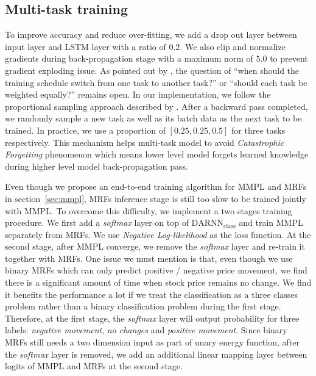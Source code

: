 \subsection{Multi-task training}
\label{sec:multi_train}

To improve accuracy and reduce over-fitting, we add a drop out
layer between input layer and LSTM layer with a ratio of $0.2$.
We also clip and normalize gradients during back-propagation
stage with a maximum norm of $5.0$ to prevent gradient exploding
issue. As pointed out by , the
question of ``when should the training schedule switch from one
task to another task?'' or ``should each task be weighted
equally?'' remains open. In our implementation, we follow the
proportional sampling approach described by
. After a backward pass completed, we
randomly sample a new task as well as its batch data as the next
task to be trained. In practice, we use a proportion of
$[0.25,0.25,0.5]$ for three tasks respectively. This mechanism
helps multi-task model to avoid \emph{Catastrophic Forgetting}
phenomenon which means lower level model forgets learned
knowledge during higher level model back-propagation pass.

Even though we propose an end-to-end training algorithm for MMPL
and MRFs in section~\ref{sec:mmpl}, MRFs inference stage is still
too slow to be trained jointly with MMPL. To overcome this
difficulty, we implement a two stages training procedure. We
first add a \emph{softmax} layer on top of
$\text{DARNN}_{\text{class}}$ and train MMPL separately from
MRFs. We use \emph{Negative Log-likelihood} as the loss function.
At the second stage, after MMPL converge, we remove the
\emph{softmax} layer and re-train it together with MRFs. One
issue we must mention is that, even though we use binary MRFs
which can only predict positive / negative price movement, we
find there is a significant amount of time when stock price
remains no change. We find it benefits the performance a lot if
we treat the classification as a three classes problem rather
than a binary classification problem during the first stage.
Therefore, at the first stage, the \emph{softmax} layer will
output probability for three labels: \emph{negative movement},
\emph{no changes} and \emph{positive movement}. Since binary MRFs
still needs a two dimension input as part of unary energy
function, after the \emph{softmax} layer is removed, we add an
additional linear mapping layer between logits of MMPL and MRFs
at the second stage.

